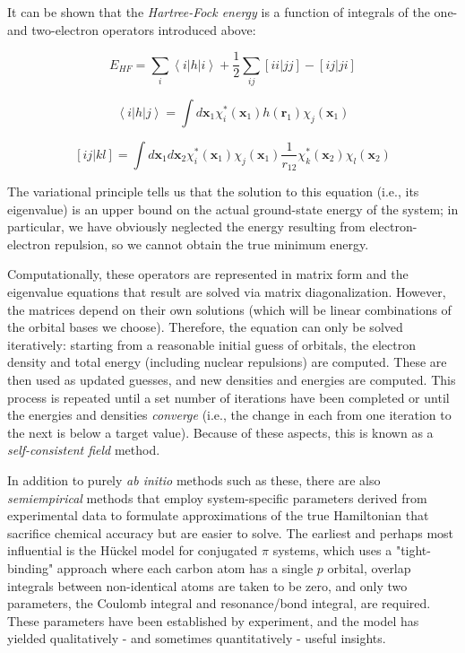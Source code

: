 \documentclass[12pt,letter,footinclude=true,headinclude=true,hyphens,oneside]{book} %
\begin{document}
    It can be shown that the \emph{Hartree-Fock energy} is a function of integrals of the one- and two-electron operators introduced above:
    
    \begin{equation}
    E_{HF} = \sum_i \left < i | h | i \right > + \frac{1}{2} \sum_{ij} \left [ ii | jj \right ] - \left [ ij | ji \right ]
    \end{equation}
    
    \begin{equation}
    \left < i | h | j \right > = \int d\mathbf{x}_1 \chi_i^* (\mathbf{x}_1)  h(\mathbf{r}_1) \chi_j (\mathbf{x}_1)
    \end{equation}
    
    \begin{equation}
    \left [ ij | kl \right ] = \int d\mathbf{x}_1 d\mathbf{x}_2 \chi_i^* (\mathbf{x}_1) \chi_j (\mathbf{x}_1) \frac{1}{r_{12}}  \chi_k^* (\mathbf{x}_2) \chi_l (\mathbf{x}_2)
    \end{equation}
    
    The variational principle tells us that the solution to this equation (i.e., its eigenvalue) is an upper bound on the actual ground-state energy of the system; in particular, we have obviously neglected the energy resulting from electron-electron repulsion, so we cannot obtain the true minimum energy.
    
    Computationally, these operators are represented in matrix form and the eigenvalue equations that result are solved via matrix diagonalization. However, the matrices depend on their own solutions (which will be linear combinations of the orbital bases we choose). Therefore, the equation can only be solved iteratively: starting from a reasonable initial guess of orbitals, the electron density and total energy (including nuclear repulsions) are computed. These are then used as updated guesses, and new densities and energies are computed. This process is repeated until a set number of iterations have been completed or until the energies and densities \emph{converge} (i.e., the change in each from one iteration to the next is below a target value). Because of these aspects, this is known as a \emph{self-consistent field} method.
    
    In addition to purely \emph{ab initio} methods such as these, there are also \emph{semiempirical} methods that employ system-specific parameters derived from experimental data to formulate approximations of the true Hamiltonian that sacrifice chemical accuracy but are easier to solve. The earliest and perhaps most influential is the H\"{u}ckel model for conjugated $\pi$ systems, which uses a "tight-binding" approach where each carbon atom has a single $p$ orbital, overlap integrals between non-identical atoms are taken to be zero, and only two parameters, the Coulomb integral and resonance/bond integral, are required. These parameters have been established by experiment, and the model has yielded qualitatively - and sometimes quantitatively - useful insights.
    
\end{document}
